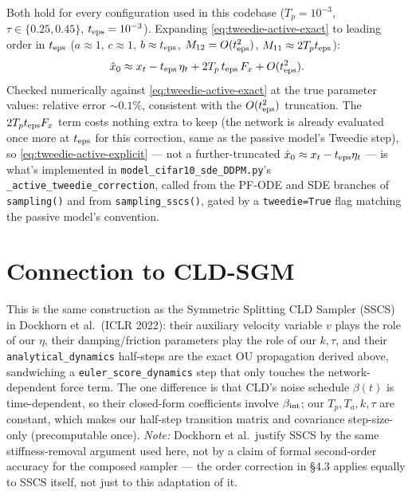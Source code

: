 \documentclass[11pt]{article}
\begin{document}
Both hold for every configuration used in this codebase ($T_p=10^{-3}$,
$\tau\in\{0.25,0.45\}$, $t_{\rm eps}=10^{-3}$). Expanding
\eqref{eq:tweedie-active-exact} to leading order in $t_{\rm eps}$
($a\approx1$, $c\approx1$, $b\approx t_{\rm eps}$, $M_{12}=O(t_{\rm eps}^2)$,
$M_{11}\approx2T_pt_{\rm eps}$):
\begin{equation}
\hat x_0 \approx x_t - t_{\rm eps}\,\eta_t + 2T_p\,t_{\rm eps}\,F_x + O(t_{\rm eps}^2).
\label{eq:tweedie-active-explicit}
\end{equation}
Checked numerically against \eqref{eq:tweedie-active-exact} at the true
parameter values: relative error $\sim0.1\%$, consistent with the $O(t_{\rm
eps}^2)$ truncation. The $2T_pt_{\rm eps}F_x$ term costs nothing extra to keep
(the network is already evaluated once more at $t_{\rm eps}$ for this
correction, same as the passive model's Tweedie step), so
\eqref{eq:tweedie-active-explicit} — not a further-truncated
$\hat x_0\approx x_t-t_{\rm eps}\eta_t$ — is what's implemented in
\texttt{model\_cifar10\_sde\_DDPM.py}'s \texttt{\_active\_tweedie\_correction},
called from the PF-ODE and SDE branches of \texttt{sampling()} and from
\texttt{sampling\_sscs()}, gated by a \texttt{tweedie=True} flag matching the
passive model's convention.

\section{Connection to CLD-SGM}

This is the same construction as the Symmetric Splitting CLD Sampler (SSCS)
in Dockhorn et al.\ (ICLR 2022): their auxiliary velocity variable $v$ plays
the role of our $\eta$, their damping/friction parameters play the role of
our $k,\tau$, and their \texttt{analytical\_dynamics} half-steps are the exact
OU propagation derived above, sandwiching a \texttt{euler\_score\_dynamics}
step that only touches the network-dependent force term. The one difference
is that CLD's noise schedule $\beta(t)$ is time-dependent, so their
closed-form coefficients involve $\beta_{\rm int}$; our $T_p,T_a,k,\tau$ are
constant, which makes our half-step transition matrix and covariance
step-size-only (precomputable once). \emph{Note:} Dockhorn et al.\ justify
SSCS by the same stiffness-removal argument used here, not by a claim of
formal second-order accuracy for the composed sampler — the order correction
in \S4.3 applies equally to SSCS itself, not just to this adaptation of it.
\end{document}
